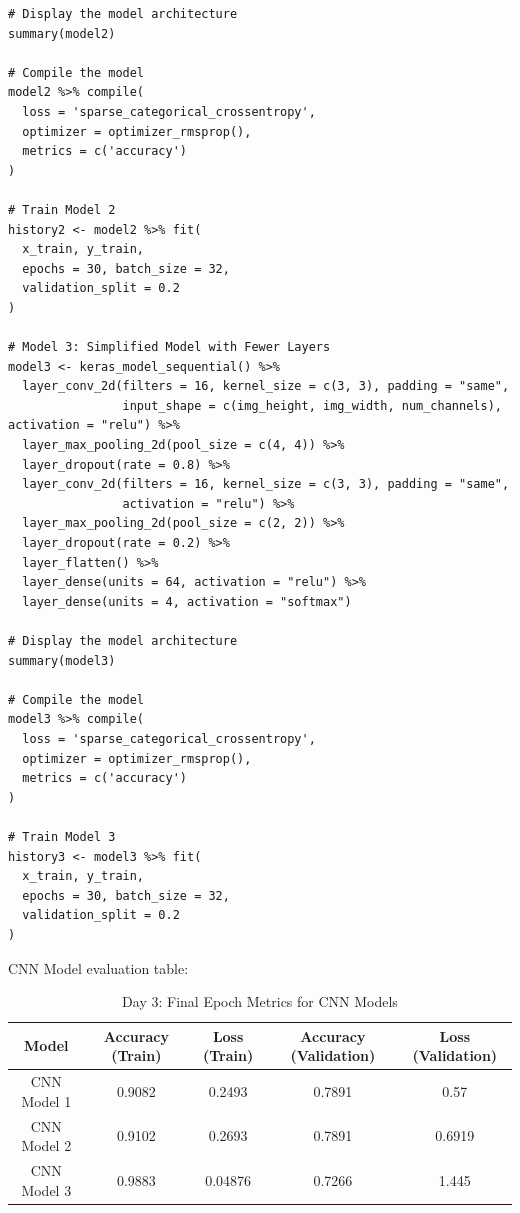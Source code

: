 \documentclass[letterpaper,11pt]{article}
\begin{document}
\begin{verbatim}
# Display the model architecture
summary(model2)

# Compile the model
model2 %>% compile(
  loss = 'sparse_categorical_crossentropy',
  optimizer = optimizer_rmsprop(),
  metrics = c('accuracy')
)

# Train Model 2
history2 <- model2 %>% fit(
  x_train, y_train,
  epochs = 30, batch_size = 32,
  validation_split = 0.2
)

# Model 3: Simplified Model with Fewer Layers
model3 <- keras_model_sequential() %>%
  layer_conv_2d(filters = 16, kernel_size = c(3, 3), padding = "same",
                input_shape = c(img_height, img_width, num_channels), activation = "relu") %>%
  layer_max_pooling_2d(pool_size = c(4, 4)) %>%
  layer_dropout(rate = 0.8) %>%
  layer_conv_2d(filters = 16, kernel_size = c(3, 3), padding = "same",
                activation = "relu") %>%
  layer_max_pooling_2d(pool_size = c(2, 2)) %>%
  layer_dropout(rate = 0.2) %>%
  layer_flatten() %>%
  layer_dense(units = 64, activation = "relu") %>%
  layer_dense(units = 4, activation = "softmax")

# Display the model architecture
summary(model3)

# Compile the model
model3 %>% compile(
  loss = 'sparse_categorical_crossentropy',
  optimizer = optimizer_rmsprop(),
  metrics = c('accuracy')
)

# Train Model 3
history3 <- model3 %>% fit(
  x_train, y_train,
  epochs = 30, batch_size = 32,
  validation_split = 0.2
)
\end{verbatim}

CNN Model evaluation table:

\begin{table}[h!]
    \centering
    \begin{tabular}{|c|c|c|c|c|}
        \hline
        \textbf{Model} & \textbf{Accuracy (Train)} & \textbf{Loss (Train)} & \textbf{Accuracy (Validation)} & \textbf{Loss (Validation)} \\ \hline
        CNN Model 1 & 0.9082 & 0.2493 & 0.7891 & 0.57 \\ \hline
        CNN Model 2 & 0.9102 & 0.2693 & 0.7891 & 0.6919 \\ \hline
        CNN Model 3 & 0.9883 & 0.04876 & 0.7266 & 1.445 \\ \hline
    \end{tabular}
    \caption{Day 3: Final Epoch Metrics for CNN Models}
    \label{tab:cnn_models}
\end{table}
\end{document}
